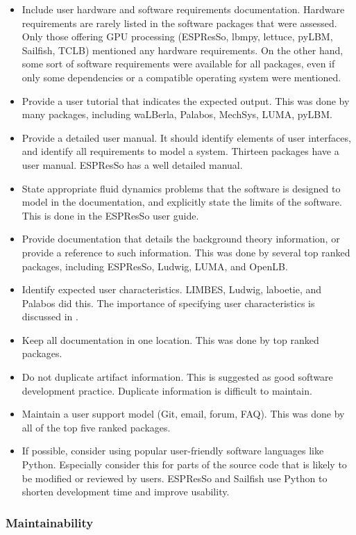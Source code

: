 \documentclass[final, 3p, times, authoryear]{elsarticle}
\begin{document}
\begin{itemize}
	\item Include user hardware and software requirements documentation. Hardware requirements are rarely listed in the software packages that were assessed. Only those offering GPU processing (ESPResSo, lbmpy, lettuce, pyLBM, Sailfish, TCLB) mentioned any hardware requirements. On the other hand, some sort of software requirements were available for all packages, even if only some dependencies or a compatible operating system were mentioned.
	\item Provide a user tutorial that indicates the expected output. This was done by many packages, including waLBerla, Palabos, MechSys, LUMA, pyLBM.
	\item Provide a detailed user manual. It should identify elements of user interfaces, and identify all requirements to model a system. Thirteen packages have a user manual. ESPResSo has a well detailed manual.
	\item State appropriate fluid dynamics problems that the software is designed to model in the documentation, and explicitly state the limits of the software. This is done in the ESPResSo user guide.
	\item Provide documentation that details the background theory information, or provide a reference to such information. This was done by several top ranked packages, including ESPResSo, Ludwig, LUMA, and OpenLB.
	\item Identify expected user characteristics. LIMBES, Ludwig, laboetie, and Palabos did this. The importance of specifying user characteristics is discussed in \citep{smith2007requirements}.
	\item Keep all documentation in one location. This was done by top ranked packages.
	\item Do not duplicate artifact information. This is suggested as good software development practice. Duplicate information is difficult to maintain. 
	\item Maintain a user support model (Git, email, forum, FAQ). This was done by all of the top five ranked packages.
	\item If possible, consider using popular user-friendly software languages like Python. Especially consider this for parts of the source code that is likely to be modified or reviewed by users. ESPResSo and Sailfish use Python to shorten development time and improve usability.
\end{itemize}

\subsubsection{Maintainability}
\end{document}
